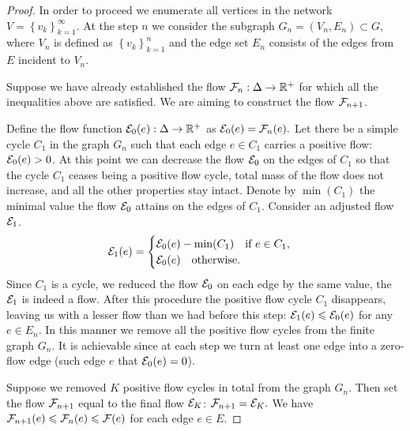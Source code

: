\documentclass[12pt]{amsart}
\begin{document}
\begin{proof}
      In order to proceed we enumerate all vertices in the network $V = \left\{v_k\right\}_{k=1}^\infty$.
      At the step $n$ we consider the subgraph $G_n = (V_n, E_n) \subset G$, where $V_n$ is defined as $\left\{v_k\right\}_{k=1}^n$
        and the edge set $E_n$ consists of the edges from $E$ incident to $V_n$.

      Suppose we have already established the flow $\flowposn{n}: \net \to \mathbb{R}^{+}$ for which
        all the inequalities above are satisfied.
      We are aiming to construct the flow $\flowposn{n+1}$.

      Define the flow function $\cal{E}_0(e): \net \to \mathbb{R}^{+}$ as $\cal{E}_0(e) = \flowposn{n}(e).$
      Let there be a simple cycle $C_1$ in the graph $G_n$ such that each edge $e \in C_1$ carries
        a positive flow: $\cal{E}_0(e) > 0$.
      At this point we can decrease the flow $\cal{E}_0$ on the edges of $C_1$ so that the cycle $C_1$
        ceases being a positive flow cycle, total mass of the flow does not increase, and all the other properties stay intact.
      Denote by $\min(C_1)$ the minimal value the flow $\cal{E}_0$ attains on the edges of $C_1$.
      Consider an adjusted flow $\cal{E}_1$.
      \begin{equation*}
        \cal{E}_1(e) =
        \begin{cases}
          \cal{E}_0(e) - \min(C_1) \quad \text{if } e \in C_1,\\
          \cal{E}_0(e) \quad \text{otherwise}.
        \end{cases}
      \end{equation*}
      Since $C_1$ is a cycle, we reduced the flow $\cal{E}_0$ on each edge by the same value,
        the $\cal{E}_1$ is indeed a flow.
      After this procedure the positive flow cycle $C_1$ disappears,
        leaving us with a lesser flow than we had before this step: $\cal{E}_1(e) \leq \cal{E}_0(e)$ for any $e \in E_n.$
      In this manner we remove all the positive flow cycles from the finite graph $G_n$.
      It is achievable since at each step we turn at least one edge into a zero-flow edge (such edge $e$ that $\cal{E}_0(e) = 0$).

      Suppose we removed $K$ positive flow cycles in total from the graph $G_n$.
      Then set the flow $\flowposn{n+1}$ equal to the final flow $\cal{E}_K$: $\flowposn{n+1} = \cal{E}_K.$
      We have $\flowposn{n+1}(e) \leq \flowposn{n}(e) \leq \flowpos(e)$ for each edge $e \in E$.


\end{proof}
\end{document}
